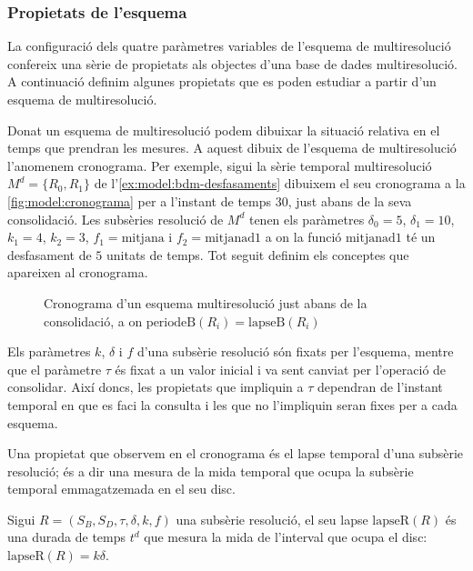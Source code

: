 



\subsubsection{Propietats de l'esquema}

La configuració dels quatre paràmetres variables de l'esquema de
multiresolució confereix una sèrie de propietats als objectes d'una
base de dades multiresolució. A continuació definim algunes propietats
que es poden estudiar a partir d'un esquema de multiresolució.


Donat un esquema de multiresolució podem dibuixar la situació relativa
en el temps que prendran les mesures. A aquest dibuix de l'esquema de
multiresolució l'anomenem cronograma. Per exemple, sigui la sèrie
temporal multiresolució $M^d=\{R_0,R_1\}$ de
l'\autoref{ex:model:bdm-desfasaments} dibuixem el seu cronograma a la
\autoref{fig:model:cronograma} per a l'instant de temps $30$, just
abans de la seva consolidació. Les subsèries resolució de $M^d$ tenen
els paràmetres $\delta_0=5$, $\delta_1=10$, $k_1=4$, $k_2=3$,
$f_1=\text{mitjana}$ i $f_2=\text{mitjanad1}$ a on la funció
$\text{mitjanad1}$ té un desfasament de $5$ unitats de temps. Tot
seguit definim els conceptes que apareixen al cronograma.

\begin{figure}[tp]
  \centering
  
  \caption{Cronograma d'un esquema multiresolució just abans de la consolidació, a on $\text{periodeB}(R_i)=\text{lapseB}(R_i)$}
  \label{fig:model:cronograma}
\end{figure}


Els paràmetres $k$, $\delta$ i $f$ d'una subsèrie resolució són fixats
per l'esquema, mentre que el paràmetre $\tau$ és fixat a un valor
inicial i va sent canviat per l'operació de consolidar. Així doncs,
les propietats que impliquin a $\tau$ dependran de l'instant temporal
en que es faci la consulta i les que no l'impliquin seran fixes per a
cada esquema.

Una propietat que observem en el cronograma és el lapse temporal d'una
subsèrie resolució; és a dir una mesura de la mida temporal que ocupa
la subsèrie temporal emmagatzemada en el seu disc.
\begin{definition} %
  Sigui $R=(S_B,S_D,\tau,\delta,k,f)$ una subsèrie resolució, el seu
  lapse $\text{lapseR}(R)$ és una durada de temps $t^d$ que mesura la
  mida de l'interval que ocupa el disc: $\text{lapseR}(R) = k\delta$.
\end{definition}


